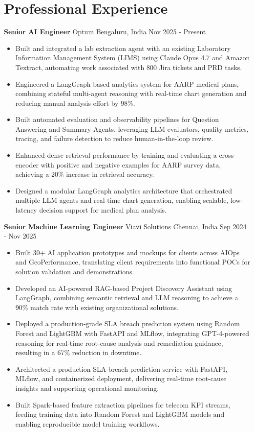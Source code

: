 \documentclass[10pt,a4paper]{article}
\newcommand{\role}[4]{\textbf{#1} \textbar{} #2 \hfill #3 \textbar{} #4\par}
\begin{document}
\section{Professional Experience}
\role{Senior AI Engineer}{Optum}{Bengaluru, India}{Nov 2025 - Present}
\begin{itemize}
  \item Built and integrated a lab extraction agent with an existing Laboratory Information Management System (LIMS) using Claude Opus 4.7 and Amazon Textract, automating work associated with 800 Jira tickets and PRD tasks.
  \item Engineered a LangGraph-based analytics system for AARP medical plans, combining stateful multi-agent reasoning with real-time chart generation and reducing manual analysis effort by 98\%.
  \item Built automated evaluation and observability pipelines for Question Answering and Summary Agents, leveraging LLM evaluators, quality metrics, tracing, and failure detection to reduce human-in-the-loop review.
  \item Enhanced dense retrieval performance by training and evaluating a cross-encoder with positive and negative examples for AARP survey data, achieving a 20\% increase in retrieval accuracy.
  \item Designed a modular LangGraph analytics architecture that orchestrated multiple LLM agents and real-time chart generation, enabling scalable, low-latency decision support for medical plan analysis.
\end{itemize}
\vspace{3pt}
\role{Senior Machine Learning Engineer}{Viavi Solutions}{Chennai, India}{Sep 2024 - Nov 2025}
\begin{itemize}
  \item Built 30+ AI application prototypes and mockups for clients across AIOps and GeoPerformance, translating client requirements into functional POCs for solution validation and demonstrations.
  \item Developed an AI-powered RAG-based Project Discovery Assistant using LangGraph, combining semantic retrieval and LLM reasoning to achieve a 90\% match rate with existing organizational solutions.
  \item Deployed a production-grade SLA breach prediction system using Random Forest and LightGBM with FastAPI and MLflow, integrating GPT-4-powered reasoning for real-time root-cause analysis and remediation guidance, resulting in a 67\% reduction in downtime.
  \item Architected a production SLA-breach prediction service with FastAPI, MLflow, and containerized deployment, delivering real-time root-cause insights and supporting operational monitoring.
  \item Built Spark-based feature extraction pipelines for telecom KPI streams, feeding training data into Random Forest and LightGBM models and enabling reproducible model training workflows.
\end{itemize}
\end{document}
